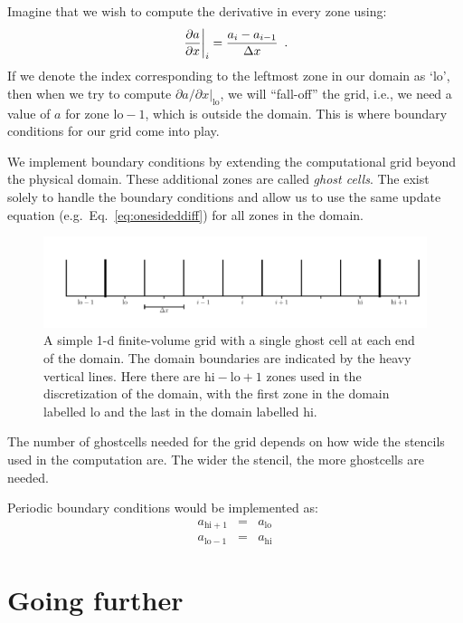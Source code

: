 Imagine that we wish to compute the derivative in every zone using:
\begin{equation}
\left . \frac{\partial a}{\partial x} \right |_i = \frac{a_i - a_{i-1}}{\Delta x} \enskip .
\label{eq:onesideddiff}
\end{equation}
If we denote the index corresponding to the leftmost zone in our
domain as `lo', then when we try to compute ${\partial a}/{\partial x}
|_\mathrm{lo}$, we will ``fall-off'' the grid, i.e., we need a value
of $a$ for zone $\mathrm{lo}-1$, which is outside the domain.  This is
where boundary conditions for our grid come into play.  

We implement boundary conditions by extending the computational grid
beyond the physical domain.  These additional zones are called {\em
  ghost cells}.  The exist solely to handle the boundary conditions
and allow us to use the same update equation (e.g.\ Eq.~\ref{eq:onesideddiff})
for all zones in the domain.

\begin{figure}[h]
\centering
\includegraphics[width=\linewidth]{simplegrid_gc}
\caption[A simple 1-d finite-volume grid with ghost cells.]{A simple
  1-d finite-volume grid with a single ghost cell at each end of the
  domain.  The domain boundaries are indicated by the heavy vertical
  lines.  Here there are $\mathrm{hi}-\mathrm{lo}+1$ zones used in the
  discretization of the domain, with the first zone in the domain
  labelled $\mathrm{lo}$ and the last in the domain labelled
  $\mathrm{hi}$.}
\end{figure}

The number of ghostcells needed for the grid depends on how wide the
stencils used in the computation are.  The wider the stencil, the more
ghostcells are needed.

Periodic boundary conditions would be implemented as:
\begin{eqnarray}
a_{\mathrm{hi}+1} &=& a_\mathrm{lo} \\
a_{\mathrm{lo}-1} &=& a_\mathrm{hi}
\end{eqnarray}



\section{Going further}

